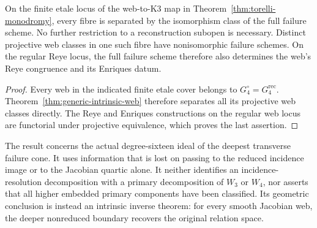 \begin{corollary}
\label{cor:separate-torelli-packet}
On the finite etale locus of the web-to-K3 map in
Theorem~\ref{thm:torelli-monodromy}, every fibre is separated by
the isomorphism class of the full failure scheme.  No further
restriction to a reconstruction subopen is necessary.
Distinct projective web classes in one such fibre have nonisomorphic
failure schemes.  On the regular Reye locus, the full failure scheme
therefore also determines the web's Reye congruence and its Enriques
datum.
\end{corollary}
\begin{proof}
Every web in the indicated finite etale cover belongs to
\(G_4^\circ=G_4^{\mathrm{rec}}\).  Theorem~\ref{thm:generic-intrinsic-web}
therefore separates all its projective web classes directly.
The Reye and Enriques constructions on
the regular web locus are functorial under projective equivalence,
which proves the last assertion.
\end{proof}

The result concerns the actual degree-sixteen ideal of the deepest
transverse failure cone.  It uses information that is lost on passing
to the reduced incidence image or to the Jacobian quartic alone.
It neither identifies an incidence-resolution decomposition with a
primary decomposition of \(W_3\) or \(W_4\), nor asserts that
all higher embedded primary components have been classified.  Its
geometric conclusion is instead an intrinsic inverse theorem: for every
smooth Jacobian web, the deeper nonreduced boundary recovers the
original relation space.


